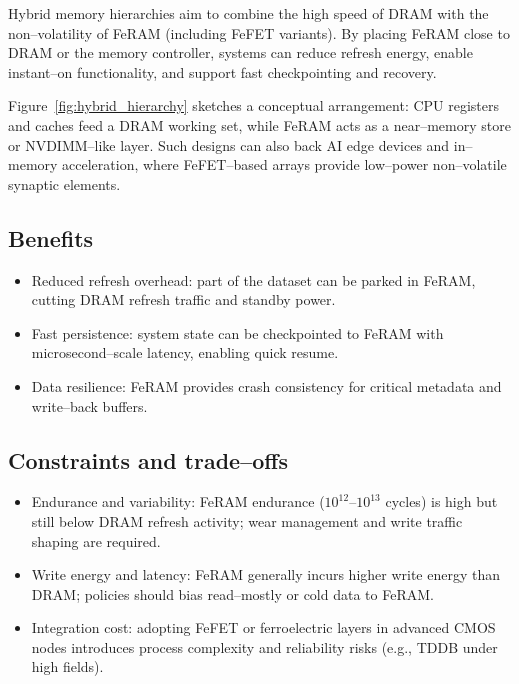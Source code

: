 Hybrid memory hierarchies aim to combine the high speed of DRAM with the non--volatility of FeRAM (including FeFET variants). By placing FeRAM close to DRAM or the memory controller, systems can reduce refresh energy, enable instant--on functionality, and support fast checkpointing and recovery.

Figure~\ref{fig:hybrid_hierarchy} sketches a conceptual arrangement: CPU registers and caches feed a DRAM working set, while FeRAM acts as a near--memory store or NVDIMM--like layer. Such designs can also back AI edge devices and in--memory acceleration, where FeFET--based arrays provide low--power non--volatile synaptic elements.

\subsection*{Benefits}
\begin{itemize}
  \item Reduced refresh overhead: part of the dataset can be parked in FeRAM, cutting DRAM refresh traffic and standby power.
  \item Fast persistence: system state can be checkpointed to FeRAM with microsecond--scale latency, enabling quick resume.
  \item Data resilience: FeRAM provides crash consistency for critical metadata and write--back buffers.
\end{itemize}

\subsection*{Constraints and trade--offs}
\begin{itemize}
  \item Endurance and variability: FeRAM endurance ($10^{12}$--$10^{13}$ cycles) is high but still below DRAM refresh activity; wear management and write traffic shaping are required.
  \item Write energy and latency: FeRAM generally incurs higher write energy than DRAM; policies should bias read--mostly or cold data to FeRAM.
  \item Integration cost: adopting FeFET or ferroelectric layers in advanced CMOS nodes introduces process complexity and reliability risks (e.g., TDDB under high fields).
\end{itemize}

